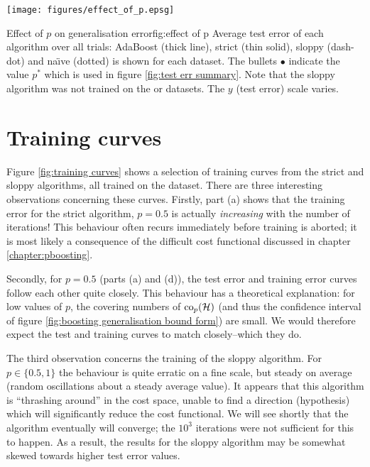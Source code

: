 \begin{linefigure}
\begin{center}
\hspace*{-1cm}\texttt{[image: figures/effect\_of\_p.epsg]}
\end{center}
\begin{capt}{Effect of $p$ on generalisation error}{fig:effect of p}
Average test error of each algorithm over all trials: AdaBoost (thick
line), strict (thin solid), sloppy (dash-dot) and na\"{\i}ve (dotted)
is shown for each dataset.  The bullets $\bullet$ indicate the value
$p^{\ast}$ which is used in figure \ref{fig:test err summary}.  Note
that the sloppy algorithm was not trained on the  or
 datasets.  The $y$ (test error) scale varies.
\end{capt}
\end{linefigure}

\section{Training curves}
\label{sec:training curves}

Figure \ref{fig:training curves} shows a selection of training curves
from the strict and sloppy algorithms, all trained on the 
dataset.  There are three interesting observations concerning these
curves.  Firstly, part (a) shows that the training error for the
strict algorithm, $p=0.5$ is actually \emph{increasing} with the number
of iterations!  This behaviour often recurs immediately before
training is aborted; it is most likely a consequence of the difficult
cost functional discussed in chapter \ref{chapter:pboosting}.

Secondly, for $p=0.5$ (parts (a) and (d)), the test error and training
error curves follow each other quite closely.  This behaviour has a
theoretical explanation: for low values of $p$, the covering numbers
of $\mathrm{co}_p(\mathcal{H})$ (and thus the confidence interval of figure
\ref{fig:boosting generalisation bound form}) are small.  We would
therefore expect the test and training curves to match closely--which
they do.

The third observation concerns the training of the sloppy algorithm.
For $p \in \{0.5, 1\}$ the behaviour is quite erratic on a fine scale,
but steady on average (random oscillations about a steady average
value).  It appears that this algorithm is ``thrashing around'' in the
cost space, unable to find a direction (hypothesis) which will
significantly reduce the cost functional.  We will see shortly that
the algorithm eventually will converge; the $10^3$ iterations were not
sufficient for this to happen.  As a result, the results for the
sloppy algorithm may be somewhat skewed towards higher test error
values.

